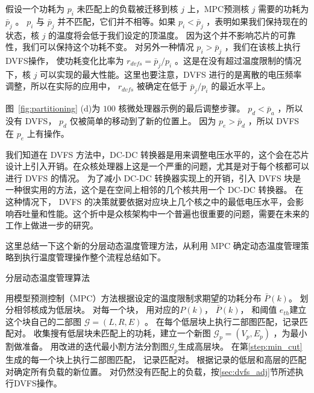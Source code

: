 假设一个功耗为 $p_i$ 未匹配上的负载被迁移到核 $j$ 上，MPC预测核 $j$ 需要的功耗为 $\bar{p}_j$ 。
$p_i$ 与 $\bar{p}_j$ 并不匹配，它们并不相等。如果 $p_i < \bar{p}_j$ ，表明如果我们保持现在的状态，核 $j$ 的温度将会低于我们设定的顶温度。
因为这个并不影响芯片的可靠性，我们可以保持这个功耗不变。
对另外一种情况 $p_i > \bar{p}_j$ ，我们在该核上执行DVFS操作，
使功耗变化比率为 $r_{dvfs} = \bar{p}_j/p_i$ 。这是在没有超过温度限制的情况下，核 $j$ 可以实现的最大性能。这里也要注意，DVFS 进行的是离散的电压频率调整，所以在实际的应用中， $r_{dvfs}$ 被确定在低于 $\bar{p}_j/p_i$ 的最近水平上。

图~\ref{fig:partitioning} (d)为 $100$ 核微处理器示例的最后调整步骤。
$p_d < \bar{p}_a$ ，所以没有 DVFS， $p_d$ 仅被简单的移动到了新的位置上。
因为 $p_e>\bar{p}_d $ ，所以 DVFS 在 $p_e$ 上有操作。

我们知道在 DVFS 方法中，DC-DC 转换器是用来调整电压水平的，这个会在芯片设计上引入开销。在众核处理器上这是一个严重的问题，尤其是对于每个核都可以进行 DVFS 的情况。
为了减小 DC-DC 转换器实现上的开销，引入 DVFS 块是一种很实用的方法，这个是在空间上相邻的几个核共用一个 DC-DC 转换器。
在这种情况下， DVFS 的决策就要依据对应块上几个核之中的最低电压水平，会影响吞吐量和性能。这个折中是众核架构中一个普遍也很重要的问题，需要在未来的工作上做进一步的研究。

这里总结一下这个新的分层动态温度管理方法，从利用 MPC 确定动态温度管理策略到执行温度管理操作整个流程总结如下。\\
\begin{algorithm}[H]
\caption{分层动态温度管理算法}
\label{alg:whole_flow}
\begin{algorithmic}[1]
  \STATE 用模型预测控制（MPC）方法根据设定的温度限制求期望的功耗分布 $\bar{P}(k)$。
  \STATE 划分相邻核成为低层块。
  \STATE 对每一个块， 用对应的$P(k)$， $\bar{P}(k)$，  和阈值 $e_{th}$建立这个块自己的二部图 $\mathcal{G} =
  (L, R, E)$ 。
   \STATE 在每个低层块上执行二部图匹配，记录匹配对。
   \STATE 收集搜有低层块未匹配上的功耗，建立一个新图 $\mathcal{G}_p = (V_p, E_p)$ ，为最小割做准备。
   \STATE 用改进的迭代最小割方法分割图$\mathcal{G}_p$生成高层块。  \label{step:min_cut}
   \STATE 在第\ref{step:min_cut}生成的每一个块上执行二部图匹配，
   记录匹配对。
   \STATE 根据记录的低层和高层的匹配对确定所有负载的新位置。 
   \STATE 对仍然没有匹配上的负载，按\ref{sec:dvfs_adj}节所述执行DVFS操作。
\end{algorithmic}
\end{algorithm}

